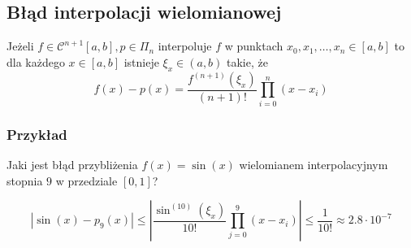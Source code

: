 \documentclass[../mn-notatki.tex]{subfiles}
\begin{document}




\subsection{Błąd interpolacji wielomianowej}
\begin{tcolorbox}
Jeżeli $f \in \mathcal{C}^{n+1}[a,b], p \in \Pi_n$ interpoluje $f$ w punktach
$x_0, x_1, \ldots, x_n \in [a,b]$ to dla każdego $x \in [a,b]$ istnieje
$\xi_x \in (a,b)$ takie, że
\[
f(x) - p(x) = \frac{f^{(n+1)}(\xi_x)}{(n+1)!} \prod_{i=0}^{n} (x-x_i)
\]
\end{tcolorbox}

\subsubsection{Przykład}

Jaki jest błąd przybliżenia $f(x) = \sin(x)$ wielomianem interpolacyjnym
stopnia $9$ w przedziale $[0,1]$?

\[
|\sin(x) - p_9(x)| \leqslant
\left| \frac{\sin^{(10)}(\xi_x)}{10!} \prod_{j=0}^{9} (x-x_i) \right|
\leqslant \frac{1}{10!} \approx 2.8 \cdot 10^{-7}
\]
\end{document}
